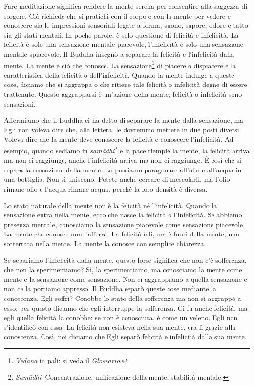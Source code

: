 Fare meditazione significa rendere la mente serena per consentire alla
saggezza di sorgere. Ciò richiede che si pratichi con il corpo e con la
mente per vedere e conoscere sia le impressioni sensoriali legate a
forma, suono, sapore, odore e tatto sia gli stati mentali. In poche
parole, è solo questione di felicità e infelicità. La felicità è solo
una sensazione mentale piacevole, l'infelicità è solo una sensazione
mentale spiacevole. Il Buddha insegnò a separare la felicità e
l'infelicità dalla mente. La mente è ciò che conosce. La
sensazione\footnote{\emph{Vedanā} in pāli; si veda il \emph{Glossario}.}
di piacere o dispiacere è la caratteristica della felicità o
dell'infelicità. Quando la mente indulge a queste cose, diciamo che si
aggrappa o che ritiene tale felicità o infelicità degne di essere
trattenute. Questo aggrapparsi è un'azione della mente; felicità o
infelicità sono sensazioni.

Affermiamo che il Buddha ci ha detto di separare la mente dalla
sensazione, ma Egli non voleva dire che, alla lettera, le dovremmo
mettere in due posti diversi. Voleva dire che la mente deve conoscere la
felicità e conoscere l'infelicità. Ad esempio, quando sediamo in
\emph{samādhi}\footnote{\emph{Samādhi}: Concentrazione, unificazione
  della mente, stabilità mentale.} e la pace riempie la mente, la
felicità arriva ma non ci raggiunge, anche l'infelicità arriva ma non ci
raggiunge. È così che si separa la sensazione dalla mente. Lo possiamo
paragonare all'olio e all'acqua in una bottiglia. Non si uniscono.
Potete anche cercare di mescolarli, ma l'olio rimane olio e l'acqua
rimane acqua, perché la loro densità è diversa.

Lo stato naturale della mente non è la felicità né l'infelicità. Quando
la sensazione entra nella mente, ecco che nasce la felicità o
l'infelicità. Se abbiamo presenza mentale, conosciamo la sensazione
piacevole come sensazione piacevole. La mente che conosce non l'afferra.
La felicità è lì, ma è fuori della mente, non sotterrata nella mente. La
mente la conosce con semplice chiarezza.

Se separiamo l'infelicità dalla mente, questo forse significa che non
c'è sofferenza, che non la sperimentiamo? Sì, la sperimentiamo, ma
conosciamo la mente come mente e la sensazione come sensazione. Non ci
aggrappiamo a quella sensazione e non ce la portiamo appresso. Il Buddha
separò queste cose mediante la conoscenza. Egli soffrì? Conobbe lo stato
della sofferenza ma non si aggrappò a esso; per questo diciamo che egli
interruppe la sofferenza. Ci fu anche felicità, ma egli quella felicità
la conobbe; se non è conosciuta, è come un veleno. Egli non s'identificò
con essa. La felicità non esisteva nella sua mente, era lì grazie alla
conoscenza. Così, noi diciamo che Egli separò felicità e infelicità
dalla sua mente.

